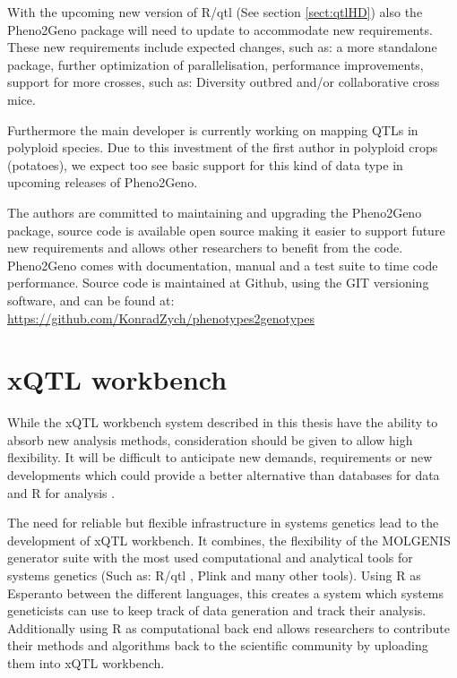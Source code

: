 With the upcoming new version of R/qtl (See section \ref{sect:qtlHD}) also the Pheno2Geno 
package will need to update to accommodate new requirements. These new requirements include 
expected changes, such as: a more standalone package, further optimization of parallelisation, 
performance improvements, support for more crosses, such as: Diversity outbred and/or 
collaborative cross mice.

Furthermore the main developer is currently working on mapping QTLs in polyploid species. Due 
to this investment of the first author in polyploid crops (potatoes), we expect too see basic 
support for this kind of data type in upcoming releases of Pheno2Geno.

The authors are committed to maintaining and upgrading the Pheno2Geno package, source code 
is available open source making it easier to support future new requirements and allows other 
researchers to benefit from the code. Pheno2Geno comes with documentation, manual and a test 
suite to time code performance. Source code is maintained at Github, using the GIT versioning 
software, and can be found at:\\
\url{https://github.com/KonradZych/phenotypes2genotypes}

\section{xQTL workbench}
\label{sect:xQTLworkbench}
While the xQTL workbench system described in this thesis have the ability to absorb new 
analysis methods, consideration should be given to allow high flexibility. It will be 
difficult to anticipate new demands, requirements or new developments which could provide 
a better alternative than databases for data and R for analysis \cite{Arends:2012}.

The need for reliable but flexible infrastructure in systems genetics lead to the development of 
xQTL workbench. It combines, the flexibility of the MOLGENIS generator suite \cite{Swertz:2010b} 
with the most used computational and analytical tools for systems genetics (Such as: R/qtl 
\cite{Broman:2003, Arends:2010}, Plink \cite{Purcell:2007} and many other tools). Using R as 
Esperanto between the different languages, this creates a system which systems geneticists can 
use to keep track of data generation and track their analysis. Additionally using R as computational 
back end allows researchers to contribute their methods and algorithms back to the scientific 
community by uploading them into xQTL workbench.

